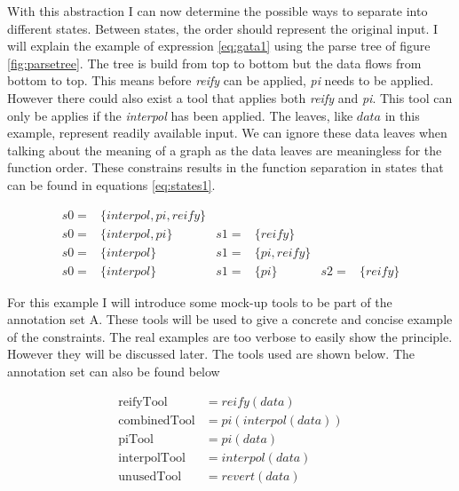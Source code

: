 \documentclass{article}
\begin{document}
With this abstraction I can now determine the possible ways to separate into different states. Between states, the order should represent the original input. I will explain the example of expression \ref{eq:gata1} using the parse tree of figure \ref{fig:parsetree}. The tree is build from top to bottom but the data flows from bottom to top. This means before \textit{reify} can be applied, \textit{pi} needs to be applied. However there could also exist a tool that applies both \textit{reify} and \textit{pi}. This tool can only be applies if the \textit{interpol} has been applied. The leaves, like $data$ in this example, represent readily available input. We can ignore these data leaves when talking about the meaning of a graph as the data leaves are meaningless for the function order. These constrains results in the function separation in states that can be found in equations \ref{eq:states1}.





 


\begin{align}
   s0=& \{interpol,pi,reify\} &   &                 &   & \nonumber  \\
    s0=& \{interpol,pi\}          & s1=& \{reify\}    &   & \nonumber\\
    s0=& \{interpol\}             & s1=& \{pi,reify\} &   & \nonumber\\
    s0=& \{interpol\}             & s1=& \{pi\}& s2=& \{reify\} \label{eq:states1}
\end{align}

For this example I will introduce some mock-up tools to be part of the annotation set A. These tools will be used to give a concrete and concise example of the constraints. The real examples are too verbose to easily show the principle. However they will be discussed later. The tools used are shown below. The annotation set can also be found below

\begin{align}
    \text{reifyTool} &= reify(data) \nonumber \\
    \text{combinedTool} &= pi(interpol(data)) \nonumber\\
    \text{piTool} &= pi(data) \nonumber\\
    \text{interpolTool} &= interpol(data) \nonumber\\
    \text{unusedTool} &= revert(data) \label{eq:allsimpletools}
\end{align}
\end{document}
